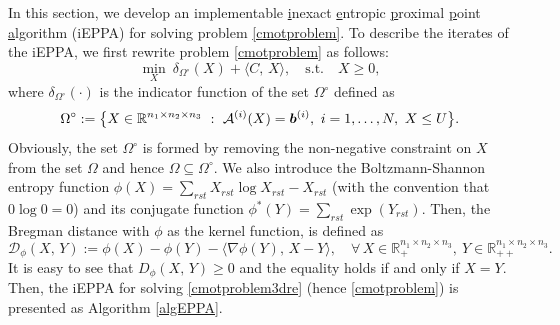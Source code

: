 \documentclass[10pt]{article}
\newcommand{\cA}{{\cal A}}
\begin{document}
In this section, we develop an implementable \underline{i}nexact \underline{e}ntropic \underline{p}roximal \underline{p}oint \underline{a}lgorithm (iEPPA) for solving problem \eqref{cmotproblem}. To describe the iterates of the iEPPA, we first rewrite problem \eqref{cmotproblem} as follows:
\begin{equation}\label{cmotproblem3dre}
\min\limits_{X}~\delta_{\Omega^{\circ}}(X) + \langle {C}, \,X\rangle, \quad \mathrm{s.t.} \quad X\geq0,
\end{equation}
where $\delta_{\Omega^{\circ}}(\cdot)$ is the indicator function of the set $\Omega^{\circ}$ defined as
\begin{equation*}
\Omega^{\circ}:=\big\{X\in\mathbb{R}^{n_1 \times n_2 \times n_3} ~:~ \cA^{(i)}(X) = \bm{b}^{(i)}, ~i = 1, \dots, N, ~X \leq U \big\}.
\end{equation*}
Obviously, the set $\Omega^{\circ}$ is formed by removing the non-negative constraint on $X$ from the set $\Omega$ and hence $\Omega\subseteq\Omega^{\circ}$. We also introduce the Boltzmann-Shannon entropy function $\phi(X)=\sum_{rst}X_{rst}\log X_{rst}-X_{rst}$ (with the convention that $0\log 0 = 0$) and its conjugate function $\phi^*(Y)=\sum_{rst}\exp(Y_{rst})$. Then, the Bregman distance \cite{b1967relaxation} with $\phi$ as the kernel function, is defined as
\begin{equation*}
\mathcal{D}_{\phi}(X, \,Y) := \phi(X) - \phi(Y) - \langle \nabla\phi(Y), \,X-Y \rangle, \quad \forall\,X\in\mathbb{R}_+^{n_1 \times n_2 \times n_3},~ Y\in\mathbb{R}_{++}^{n_1 \times n_2 \times n_3}.
\end{equation*}
It is easy to see that $D_{\phi}(X, \,Y)\geq0$ and the equality holds if and only if $X=Y$. Then, the iEPPA for solving \eqref{cmotproblem3dre} (hence \eqref{cmotproblem}) is presented as Algorithm \ref{algEPPA}.
\end{document}
